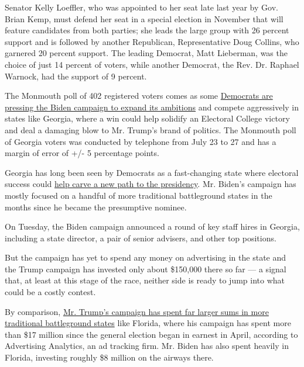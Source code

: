 Senator Kelly Loeffler, who was appointed to her seat late last year by
Gov. Brian Kemp, must defend her seat in a special election in November
that will feature candidates from both parties; she leads the large
group with 26 percent support and is followed by another Republican,
Representative Doug Collins, who garnered 20 percent support. The
leading Democrat, Matt Lieberman, was the choice of just 14 percent of
voters, while another Democrat, the Rev. Dr. Raphael Warnock, had the
support of 9 percent.

The Monmouth poll of 402 registered voters comes as some
\href{https://www.nytimes3xbfgragh.onion/2020/07/11/us/politics/trump-biden-2020-election.html}{Democrats
are pressing the Biden campaign to expand its ambitions} and compete
aggressively in states like Georgia, where a win could help solidify an
Electoral College victory and deal a damaging blow to Mr. Trump's brand
of politics. The Monmouth poll of Georgia voters was conducted by
telephone from July 23 to 27 and has a margin of error of +/- 5
percentage points.

Georgia has long been seen by Democrats as a fast-changing state where
electoral success could
\href{https://www.nytimes3xbfgragh.onion/2020/06/09/us/politics/georgia-primary-election-senate-race-jon-ossoff.html}{help
carve a new path to the presidency}. Mr. Biden's campaign has mostly
focused on a handful of more traditional battleground states in the
months since he became the presumptive nominee.

On Tuesday, the Biden campaign announced a round of key staff hires in
Georgia, including a state director, a pair of senior advisers, and
other top positions.

But the campaign has yet to spend any money on advertising in the state
and the Trump campaign has invested only about \$150,000 there so far
--- a signal that, at least at this stage of the race, neither side is
ready to jump into what could be a costly contest.

By comparison,
\href{https://www.nytimes3xbfgragh.onion/2020/07/28/us/politics/campaign-ad-buys.html}{Mr.
Trump's campaign has spent far larger sums in more traditional
battleground states} like Florida, where his campaign has spent more
than \$17 million since the general election began in earnest in April,
according to Advertising Analytics, an ad tracking firm. Mr. Biden has
also spent heavily in Florida, investing roughly \$8 million on the
airways there.

\hypertarget{-2}{%
\subsection{}\label{-2}}

